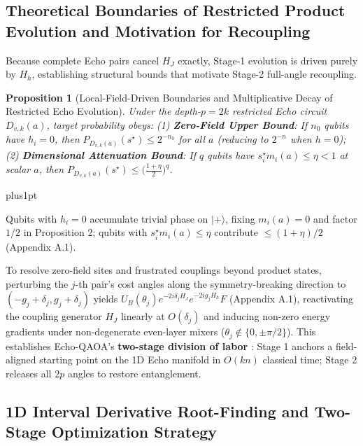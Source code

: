 \documentclass{article}
\makeatletter
\renewenvironment{proof}[1][\proofname]{\par
  \pushQED{\qed}%
  \normalfont \topsep1pt plus1pt\relax
  \trivlist
  \item[\hskip\labelsep
        \itshape
    #1\@addpunct{.}]\ignorespaces
}{%
  \popQED\endtrivlist\@endpefalse
}
\theoremstyle{plain}
\newtheorem{proposition}{Proposition}
\theoremstyle{definition}
\makeatother
\begin{document}
\subsection{Theoretical Boundaries of Restricted Product Evolution and Motivation for Recoupling}\label{subsec:3_7}

Because complete Echo pairs cancel $H_J$ exactly, Stage-1 evolution is driven purely by $H_h$, establishing structural bounds that motivate Stage-2 full-angle recoupling.

\begin{proposition}[Local-Field-Driven Boundaries and Multiplicative Decay of Restricted Echo Evolution]
\label{prop:5}
Under the depth-$p=2k$ restricted Echo circuit $D_{v,k}(a)$, target probability obeys:
(1) \textbf{Zero-Field Upper Bound}: If $n_0$ qubits have $h_i=0$, then $P_{D_{v,k}(a)}(s^\star)\le 2^{-n_0}$ for all $a$ (reducing to $2^{-n}$ when $h=0$);
(2) \textbf{Dimensional Attenuation Bound}: If $q$ qubits have $s_i^\star m_i(a)\le\eta<1$ at scalar $a$, then $P_{D_{v,k}(a)}(s^\star)\le\big(\frac{1+\eta}{2}\big)^q$.
\end{proposition}

\begin{proof}[Proof Sketch]
Qubits with $h_i=0$ accumulate trivial phase on $|+\rangle$, fixing $m_i(a)=0$ and factor $1/2$ in Proposition 2; qubits with $s_i^\star m_i(a)\le\eta$ contribute $\le(1+\eta)/2$ (Appendix A.1).
\end{proof}

To resolve zero-field sites and frustrated couplings beyond product states, perturbing the $j$-th pair's cost angles along the symmetry-breaking direction to $(-g_j+\delta_j, g_j+\delta_j)$ yields $U_B(\theta_j)e^{-2i\delta_j H_J}e^{-2ig_j H_h}F$ (Appendix A.1), reactivating the coupling generator $H_J$ linearly at $O(\delta_j)$ and inducing non-zero energy gradients under non-degenerate even-layer mixers ($\theta_j\notin\{0,\pm\pi/2\}$). This establishes Echo-QAOA's \textbf{two-stage division of labor} \citep{dupont2022entanglement,wurtz2022counterdiabaticity,yang2017optimizing}: Stage 1 anchors a field-aligned starting point on the 1D Echo manifold in $O(kn)$ classical time; Stage 2 releases all $2p$ angles to restore entanglement.

\subsection{1D Interval Derivative Root-Finding and Two-Stage Optimization Strategy}\label{subsec:3_8}
\end{document}
